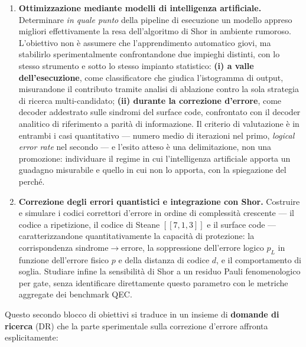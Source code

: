 \begin{onehalfspace}
\begin{enumerate}
    \item \textbf{Ottimizzazione mediante modelli di intelligenza artificiale.}
    Determinare \emph{in quale punto} della pipeline di esecuzione un modello appreso migliori effettivamente la resa dell'algoritmo di Shor in ambiente rumoroso. L'obiettivo non è assumere che l'apprendimento automatico giovi, ma stabilirlo sperimentalmente confrontandone due impieghi distinti, con lo stesso strumento e sotto lo stesso impianto statistico: \textbf{(i) a valle dell'esecuzione}, come classificatore che giudica l'istogramma di output, misurandone il contributo tramite analisi di ablazione contro la sola strategia di ricerca multi-candidato; \textbf{(ii) durante la correzione d'errore}, come decoder addestrato sulle sindromi del surface code, confrontato con il decoder analitico di riferimento a parità di informazione. Il criterio di valutazione è in entrambi i casi quantitativo --- numero medio di iterazioni nel primo, \textit{logical error rate} nel secondo --- e l'esito atteso è una delimitazione, non una promozione: individuare il regime in cui l'intelligenza artificiale apporta un guadagno misurabile e quello in cui non lo apporta, con la spiegazione del perché.

    \item \textbf{Correzione degli errori quantistici e integrazione con Shor.}
    Costruire e simulare i codici correttori d'errore in ordine di complessità crescente --- il codice a ripetizione, il codice di Steane $[[7,1,3]]$ e il surface code --- caratterizzandone quantitativamente la capacità di protezione: la corrispondenza sindrome$\rightarrow$errore, la soppressione dell'errore logico $p_L$ in funzione dell'errore fisico $p$ e della distanza di codice $d$, e il comportamento di soglia. Studiare infine la sensibilità di Shor a un residuo Pauli fenomenologico per gate, senza identificare direttamente questo parametro con le metriche aggregate dei benchmark QEC.

\end{enumerate}

Questo secondo blocco di obiettivi si traduce in un insieme di \textbf{domande di ricerca} (DR) che la parte sperimentale sulla correzione d'errore affronta esplicitamente:


\end{onehalfspace}
